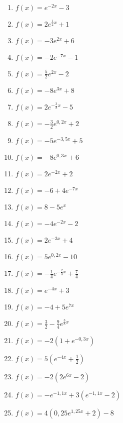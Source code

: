 \begin{Exercise}[title={Bestimme den y-Achsenabschnitt, skizziere das Schaubild, gib die Asymptote, das Verhalten für \(x\rightarrow \pm\infty\) und die Monotonie an}, label=eFktA2]\\
	\begin{minipage}{\textwidth}
		\begin{minipage}{0.49\textwidth}
			\begin{enumerate}[label=\alph*)]
				\item \(f(x)=e^{-2x}-3\)
				\item \(f(x)=2e^{\frac{1}{2}x}+1\)
				\item \(f(x)=-3e^{2x}+6\)
				\item \(f(x)=-2e^{-7x}-1\)
				\item \(f(x)=\frac{5}{2}e^{2x}-2\)
				\item \(f(x)=-8e^{3x}+8\)
				\item \(f(x)=2e^{-\frac{3}{8}x}-5\)
				\item \(f(x)=-\frac{3}{2}e^{0,2x}+2\)
				\item \(f(x)=-5e^{-3,5x}+5\)
				\item \(f(x)=-8e^{0,3x}+6\)
				\item \(f(x)=2e^{-2x}+2\)
				\item \(f(x)=-6+4e^{-7x}\)
				\item \(f(x)=8-5e^{x}\)
			\end{enumerate}
		\end{minipage}
		\begin{minipage}{0.49\textwidth}
			\begin{enumerate}[label=\alph*)]
				\setcounter{enumi}{13}
				\item \(f(x)=-4e^{-2x}-2\)
				\item \(f(x)=2e^{-3x}+4\)
				\item \(f(x)=5e^{0,2x}-10\)
				\item \(f(x)=-\frac{1}{4}e^{-\frac{2}{3}x}+\frac{7}{4}\)
				\item \(f(x)=e^{-4x}+3\)
				\item \(f(x)=-4+5e^{7x}\)
				\item \(f(x)=\frac{3}{2}-\frac{9}{4}e^{\frac{3}{8}x}\)
				\item \(f(x)=-2\left(1+e^{-0,3x}\right) \)
				\item \(f(x)=5\left(e^{-4x}+\frac{1}{2}\right) \)
				\item \(f(x)=-2\left( 2e^{6x}-2\right) \)
				\item \(f(x)=-e^{-1,1x}+3\left(e^{-1,1x}-2\right)\)
				\item \(f(x)=4\left( 0,25e^{1,25x}+2\right) -8\)
			\end{enumerate}
		\end{minipage}
	\end{minipage}
\end{Exercise}
